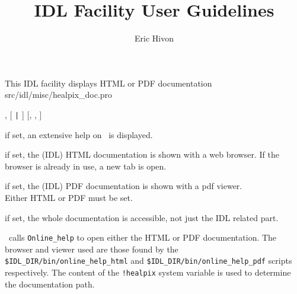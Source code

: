 


\sloppy



\title{\healpix IDL Facility User Guidelines}
 \section[healpix\_doc: PDF and HTML documentation]{ }
\label{idl:healpix_doc}
\author{Eric Hivon}




\begin{facility}
{This IDL facility displays HTML or PDF \healpix documentation}
{src/idl/misc/healpix\_doc.pro}
\end{facility}

\begin{IDLformat}
{\thedocid , [%
 {\tt |} %
] [, %
,  %
] }
\end{IDLformat}

\begin{keywords}
  \begin{kwlist}{} %
    \item[HELP\mytarget{idl:healpix_doc:HELP}%
=] if set, an extensive help on \thedocid\ is displayed.
    \item[HTML\mytarget{idl:healpix_doc:HTML}%
=]  if set, the \healpix (IDL) HTML documentation is shown with a web browser.
            If the browser is already in use, a new tab is open.
    \item[PDF\mytarget{idl:healpix_doc:PDF}%
=]   if set, the \healpix (IDL) PDF documentation is shown with a pdf viewer.\\
            Either HTML or PDF must be set.
    \item[WHOLE\mytarget{idl:healpix_doc:WHOLE}%
=]  if set, the whole \healpix documentation is accessible,
              not just the IDL related part.
  \end{kwlist}
\end{keywords}  

\begin{codedescription}
{\thedocid\  calls {\tt Online\_help} to open either the HTML or PDF \healpix
documentation. The browser and viewer used are those found by the 
{\tt \$IDL\_DIR/bin/online\_help\_html} and 
{\tt \$IDL\_DIR/bin/online\_help\_pdf} scripts respectively.
The content of the {\tt !healpix} system variable is used to
determine the documentation path.}
\end{codedescription}



